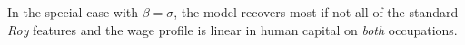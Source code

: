 \documentclass[onehalfspacing,11pt]{article}
\begin{document}
In the special case with $\beta=\sigma$, the model recovers most if not all of the standard {\it Roy} features and the wage profile is linear in human capital on {\it both} occupations.

%
%
%
\end{document}
